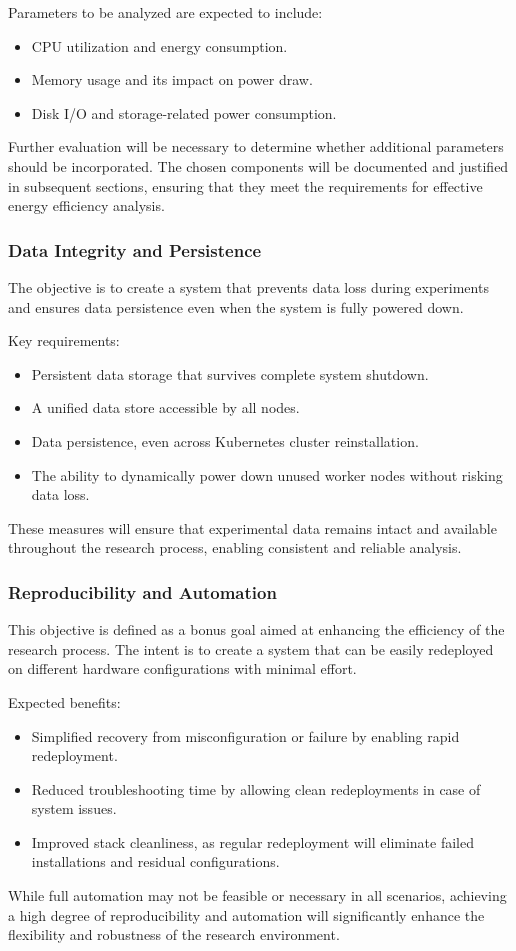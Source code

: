 Parameters to be analyzed are expected to include:
\begin{itemize}
\item CPU utilization and energy consumption.
\item Memory usage and its impact on power draw.
\item Disk I/O and storage-related power consumption.
\end{itemize}

Further evaluation will be necessary to determine whether additional parameters should be incorporated. The chosen components will be documented and justified in subsequent sections, ensuring that they meet the requirements for effective energy efficiency analysis.

\subsubsection{Data Integrity and Persistence}

The objective is to create a system that prevents data loss during experiments and ensures data persistence even when the system is fully powered down.

Key requirements:
\begin{itemize}
\item Persistent data storage that survives complete system shutdown.
\item A unified data store accessible by all nodes.
\item Data persistence, even across Kubernetes cluster reinstallation.
\item The ability to dynamically power down unused worker nodes without risking data loss.
\end{itemize}
These measures will ensure that experimental data remains intact and available throughout the research process, enabling consistent and reliable analysis.

\subsubsection{Reproducibility and Automation}

This objective is defined as a bonus goal aimed at enhancing the efficiency of the research process. The intent is to create a system that can be easily redeployed on different hardware configurations with minimal effort.

Expected benefits:
\begin{itemize}
\item Simplified recovery from misconfiguration or failure by enabling rapid redeployment.
\item Reduced troubleshooting time by allowing clean redeployments in case of system issues.
\item Improved stack cleanliness, as regular redeployment will eliminate failed installations and residual configurations.
\end{itemize}
While full automation may not be feasible or necessary in all scenarios, achieving a high degree of reproducibility and automation will significantly enhance the flexibility and robustness of the research environment.

